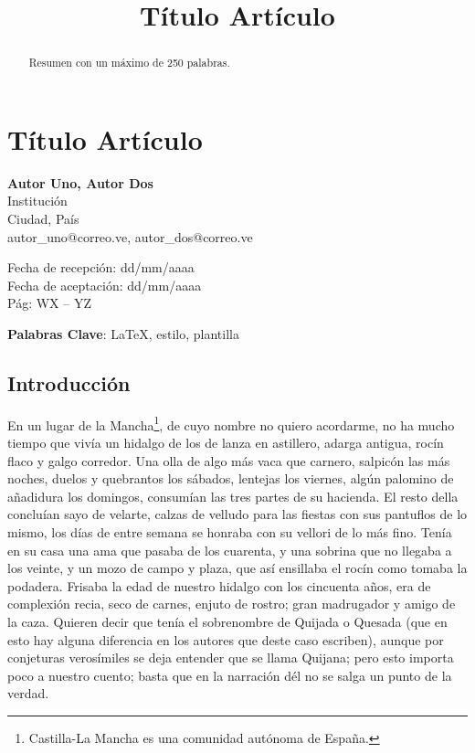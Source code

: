 
%
\newpage
\title{Título Artículo}
\section{Título Artículo}

\begin{center}
\textbf{Autor Uno, Autor Dos} \\
Institución\\
Ciudad, País\\
autor_uno@correo.ve, autor_dos@correo.ve
\end{center}

\begin{flushright}
Fecha de recepción: dd/mm/aaaa\\
Fecha de aceptación: dd/mm/aaaa\\
Pág: WX -- YZ
\end{flushright}

\begin{abstract}
Resumen con un máximo de 250 palabras.
\end{abstract}

\textbf{Palabras Clave}: \LaTeX, estilo, plantilla

\subsection{Introducción}
En un lugar de la Mancha\footnote{Castilla-La Mancha es una comunidad autónoma de España.}, de cuyo nombre no quiero acordarme, no ha mucho tiempo que vivía un hidalgo de los de lanza en astillero, adarga antigua, rocín flaco y galgo corredor. Una olla de algo más vaca que carnero, salpicón las más noches, duelos y quebrantos los sábados, lentejas los viernes, algún palomino de añadidura los domingos, consumían las tres partes de su hacienda. El resto della concluían sayo de velarte, calzas de velludo para las fiestas con sus pantuflos de lo mismo, los días de entre semana se honraba con su vellori de lo más fino. Tenía en su casa una ama que pasaba de los cuarenta, y una sobrina que no llegaba a los veinte, y un mozo de campo y plaza, que así ensillaba el rocín como tomaba la podadera. Frisaba la edad de nuestro hidalgo con los cincuenta años, era de complexión recia, seco de carnes, enjuto de rostro; gran madrugador y amigo de la caza. Quieren decir que tenía el sobrenombre de Quijada o Quesada (que en esto hay alguna diferencia en los autores que deste caso escriben), aunque por conjeturas verosímiles se deja entender que se llama Quijana; pero esto importa poco a nuestro cuento; basta que en la narración dél no se salga un punto de la verdad. 

